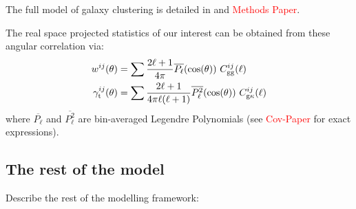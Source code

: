 \documentclass[fleqn,usenatbib]{mnras}
\newcommand{\red}[1]{\textcolor{red}{#1}}
\begin{document}
The full model of galaxy clustering is detailed in \cite{Fang_nonlimber} and \red{Methods Paper}. 

The real space projected statistics of our interest can be obtained from these angular correlation via:
\begin{align}
    w^{ij}(\theta) &= \sum \frac{2\ell + 1}{4\pi} \overline{P_{\ell}}(\cos(\theta)) \ C^{ij}_{\rm gg}(\ell) \\
    \gamma_{\rm t}^{ij}(\theta) &= \sum \frac{2\ell + 1}{4\pi \ell (\ell + 1)} \overline{P_{\ell}^2}(\cos(\theta)) \ C^{ij}_{\rm g\kappa}(\ell)
\end{align}
where $\overline{P_{\ell}}$ and $\overline{P_{\ell}^2}$ are bin-averaged Legendre Polynomials (see \red{Cov-Paper} for exact expressions). 

\subsection{The rest of the model}
\label{sec:full_pk_th}
Describe the rest of the modelling framework:
\end{document}
